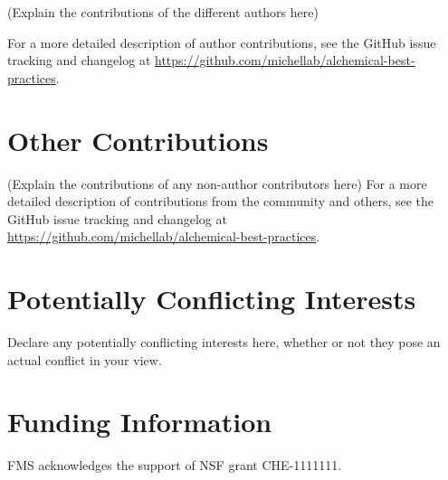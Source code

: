 \documentclass[9pt,bestpractices]{livecoms}
\newcommand{\githubrepository}{\url{https://github.com/michellab/alchemical-best-practices}}  %
\begin{document}
(Explain the contributions of the different authors here)

For a more detailed description of author contributions,
see the GitHub issue tracking and changelog at \githubrepository.

\section*{Other Contributions}
%

(Explain the contributions of any non-author contributors here)
For a more detailed description of contributions from the community and others, see the GitHub issue tracking and changelog at \githubrepository.

\section*{Potentially Conflicting Interests}

Declare any potentially conflicting interests here, whether or not they pose an actual conflict in your view.

\section*{Funding Information}
FMS acknowledges the support of NSF grant CHE-1111111.




\end{document}
